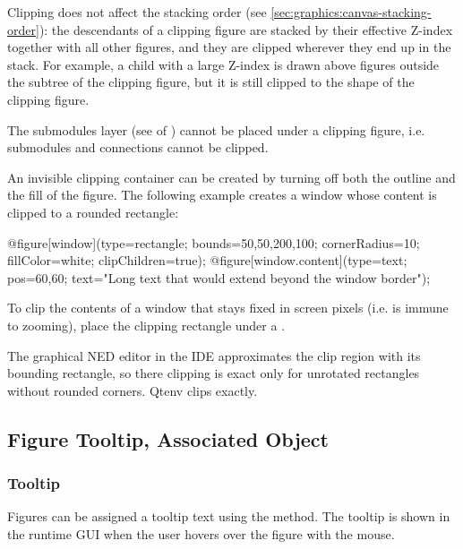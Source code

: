 Clipping does not affect the stacking order (see
\ref{sec:graphics:canvas-stacking-order}): the descendants of a clipping figure
are stacked by their effective Z-index together with all other figures, and
they are clipped wherever they end up in the stack. For example, a child with a
large Z-index is drawn above figures outside the subtree of the clipping figure,
but it is still clipped to the shape of the clipping figure.

The submodules layer (see  of )
cannot be placed under a clipping figure, i.e. submodules and connections
cannot be clipped.

An invisible clipping container can be created by turning off both the outline
and the fill of the figure. The following example creates a window whose
content is clipped to a rounded rectangle:

\begin{ned}
@figure[window](type=rectangle; bounds=50,50,200,100; cornerRadius=10;
                fillColor=white; clipChildren=true);
@figure[window.content](type=text; pos=60,60;
                        text="Long text that would extend beyond the window border");
\end{ned}

To clip the contents of a window that stays fixed in screen pixels (i.e.
is immune to zooming), place the clipping rectangle under a
.

\begin{note}
The graphical NED editor in the IDE approximates the clip region with its
bounding rectangle, so there clipping is exact only for unrotated rectangles
without rounded corners. Qtenv clips exactly.
\end{note}


\subsection{Figure Tooltip, Associated Object}
\label{sec:graphics:figure-tooltip-associated-object}

\subsubsection{Tooltip}
\label{sec:graphics:figure-tooltip}

Figures can be assigned a tooltip text using the  method.
The tooltip is shown in the runtime GUI when the user hovers over the figure
with the mouse.

